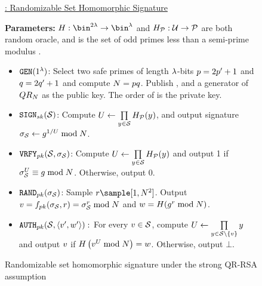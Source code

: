\begin{figure}
\begin{mdframed}
\footnotesize
\underline{\ourSigScheme: Randomizable Set Homomorphic Signature}

\textbf{Parameters:} $\ro: \bin^{2\secParam} \rightarrow \bin^{\secParam}$ and $H_{\mathcal{P}}: \mathcal{U} \rightarrow \mathcal{P}$  are both random oracle, and \primes is the set of odd primes less than a semi-prime modulus \rsaMod.


\begin{itemize}[leftmargin = 1.5em]

	\item $\keyGen(1^{\secParam})$: Select two safe primes of length 
	$\lambda$-bits $\safePrime[1] = 2 \sgPrime[1] + 1$ and 
	$\safePrime[2] = 2 \sgPrime[2] + 1$ and compute $\rsaMod = \safePrime[1] 
	\safePrime[2]$. Publish \rsaMod, and a generator \qrGen of $QR_{N}$ as the public key. 
	The order of \qrGroup is the private key. 
	
	\item \textbf{$\signingAlg[\privKey](\genericSetVar)$}: Compute $\accSet \assign \accSetDefn$, and output signature 
	 $\genericSig[\genericSetVar] \assign 
	\qrGen^{1/\accSet} \bmod \rsaMod$. 

	\item \textbf{$\verify[\pubKey](\genericSetVar, \genericSig[\genericSetVar])$}: Compute $\accSet \assign \accSetDefn$ and 
	output 1 if
	$\genericSig[\genericSetVar]^{\accSet} \equiv \qrGen \bmod 
	\rsaMod$. Otherwise, output 0. 
			
	\item \textbf{$\randomize[\pubKey](\genericSig[\genericSetVar])$}: Sample $\genericRand \sample \nats[1][\rsaMod^2]$. 
	Output $\genericSigPair[1] = \randomizeFn[\pubKey](\genericSig[\genericSetVar], \genericRand) = 
	\genericSig[\genericSetVar]^{\genericRand} \bmod \rsaMod$ and $\genericSigPair[2] = 
	\ro(\qrGen^{\genericRand} \bmod \rsaMod)$. 
	
	
	\item \textbf{$\verifyRand[\pubKey](\genericSetVar, \genericSigPairAlt):$} For every $\genericSigPair[1] \in \genericSetVar$, compute $\accSet \assign \prod\limits_{\genericCInputElmt \in \genericSetVar \setminus \{ \genericSigPair[1] \}} \genericCInputElmt$ and 
	output $\genericSigPair[1]$ if $\ro\left(\genericSigPair[1]^{\accSet} \bmod \rsaMod\right) = \genericSigPair[2]$. Otherwise, output $\bot$. 
		
\end{itemize}
\end{mdframed}
\vspace{-0.3cm}
\caption{Randomizable set homomorphic signature under the strong QR-RSA assumption\label{sig:construction}}
\end{figure}

